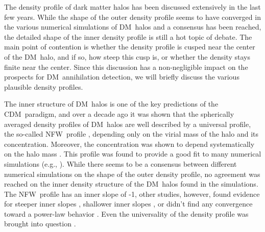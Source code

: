 \documentclass[aps,prd,twocolumn,amsmath,amssymb,floatfix,nofootinbib,10pt]{revtex4}
\newcommand{\eg}{e.g.}
\newcommand{\CDM}{CDM}
\newcommand{\NFW}{NFW}
\newcommand{\DM}{DM}
\begin{document}
The density profile of dark matter halos has been discussed
extensively in the last few years. While the shape of the outer
density profile seems to have converged in the various numerical
simulations of \DM\ halos and a consensus has been reached, the
detailed shape of the inner density profile is still a hot topic of
debate. The main point of contention is whether the density profile is
cusped near the center of the \DM\ halo, and if so, how steep this
cusp is, or whether the density stays finite near the center. Since
this discussion has a non-negligible impact on the prospects for \DM\
annihilation detection, we will briefly discuss the various plausible
density profiles.

The inner structure of \DM\ halos is one of the key predictions of the
\CDM\ paradigm, and over a decade ago it was shown that the
spherically averaged density profiles of \DM\ halos are well described
by a universal profile, the so-called \NFW\ profile
\cite{1995MNRAS.275..720N,1996ApJ...462..563N,1997ApJ...490..493N},
depending only on the virial mass of the halo and its
concentration. Moreover, the concentration was shown to depend
systematically on the halo mass
\cite{1996ApJ...462..563N,1997ApJ...490..493N,2001MNRAS.321..559B,2001ApJ...554..114E,2007MNRAS.381.1450N,2008MNRAS.387..536G}. This
profile was found to provide a good fit to many numerical simulations
(\eg,
\cite{1996MNRAS.281..716C,1997MNRAS.286..865T,1997ApJS..111...73K}).
While there seems to be a consensus between different numerical
simulations on the shape of the outer density profile, no agreement
was reached on the inner density structure of the \DM\ halos found in
the simulations. The \NFW\ profile has an inner slope of -1, other
studies, however, found evidence for steeper inner slopes
\cite{1997ApJ...477L...9F,1998ApJ...499L...5M,1999MNRAS.310.1147M,2000ApJ...544..616G,2001ApJ...554..903K,2001ApJ...557..533F,2004MNRAS.353..624D},
shallower inner slopes \cite{1998ApJ...502...48K}, or didn't find any
convergence toward a power-law behavior
\cite{2003MNRAS.338...14P}. Even the universality of the density
profile was brought into question
\cite{2000ApJ...529L..69J,2000ApJ...535...30J}.
\end{document}
